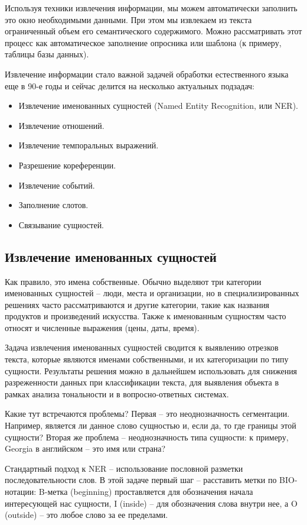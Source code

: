 \documentclass{article}
\begin{document}
Используя техники извлечения информации, мы можем автоматически заполнить это окно необходимыми данными. При этом мы извлекаем из текста ограниченный объем его семантического содержимого. Можно рассматривать этот процесс как автоматическое заполнение опросника или шаблона (к примеру, таблицы базы данных).

Извлечение информации стало важной задачей обработки естественного языка еще в 90-е годы и сейчас делится на несколько актуальных подзадач:
\begin{itemize}
\item Извлечение именованных сущностей (Named Entity Recognition, или NER).
\item Извлечение отношений.
\item Извлечение темпоральных выражений.
\item Разрешение кореференции.
\item Извлечение событий.
\item Заполнение слотов.
\item Связывание сущностей.
\end{itemize}

\subsection{Извлечение именованных сущностей}

Как правило, это имена собственные. Обычно выделяют три категории именованных сущностей – люди, места и организации, но в специализированных решениях часто рассматриваются и другие категории, такие как названия продуктов и произведений искусства. Также к именованным сущностям часто относят и численные выражения (цены, даты, время).

Задача извлечения именованных сущностей сводится к выявлению отрезков текста, которые являются именами собственными, и их категоризации по типу сущности. Результаты решения можно в дальнейшем использовать для снижения разреженности данных при классификации текста, для выявления объекта в рамках анализа тональности и в вопросно-ответных системах.

Какие тут встречаются проблемы?
Первая – это неоднозначность сегментации. Например, является ли данное слово сущностью и, если да, то где границы этой сущности?
Вторая же проблема – неоднозначность типа сущности: к примеру, Georgia в английском – это имя или страна?

Стандартный подход к NER – использование пословной разметки последовательности слов. В этой задаче первый шаг – расставить метки по BIO-нотации: B-метка (beginning) проставляется для обозначения начала интересующей нас сущности, I (inside) – для обозначения слова внутри нее, а O (outside) – это любое слово за ее пределами.
\end{document}

